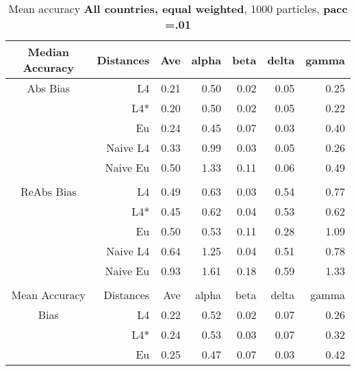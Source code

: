 \documentclass[a4paper,12pt,twoside]{book}
\begin{document}
\begin{table}[H]

\centering
\vfill
\vspace{2cm}
\caption{Mean  accuracy \textbf{All countries, equal weighted}, 1000 particles, \textbf{pacc =.01}}


\begin{tabular}{crrrrrr}

  \hline
  
{\color{blue}Median Accuracy} & Distances & Ave & alpha & beta & delta & gamma \\ 
  \hline
{\color{blue}Abs Bias} & L4  &0.21 & 0.50 & 0.02 & 0.05 & 0.25 \\ 
  
 
&L4*  & 0.20 & 0.50 & 0.02 & 0.05 & 0.22 \\ 
 
  
&Eu &   0.24 & 0.45 & 0.07 & 0.03 & 0.40 \\ 
   
 
&Naive L4&     0.33 & 0.99 & 0.03 & 0.05 & 0.26 \\ 
  
&Naive Eu &   0.50 & 1.33 & 0.11 & 0.06 & 0.49 \\ 
   \\ 
  
   \hline
   
{\color{blue} ReAbs Bias } & L4  &0.49 & 0.63 & 0.03 & 0.54 & 0.77 \\ 
 
&L4*  & 
  0.45 & 0.62 & 0.04 & 0.53 & 0.62 \\ 
  
&Eu &   
   0.50 & 0.53 & 0.11 & 0.28 & 1.09 \\ 
  
  
&Naive L4& 0.64 & 1.25 & 0.04 & 0.51 & 0.78 \\  
  
&Naive Eu &     
   0.93 & 1.61 & 0.18 & 0.59 & 1.33 \\\\
   \hline
{\color{blue}Mean Accuracy} & Distances & Ave & alpha & beta & delta & gamma \\ 
  \hline
{\color{blue}Bias} & L4  &0.22 & 0.52 & 0.02 & 0.07 & 0.26 \\ 
  
&L4*  &0.24 & 0.53 & 0.03 & 0.07 & 0.32 \\ 
  
  
&Eu &   0.25 & 0.47 & 0.07 & 0.03 & 0.42 \\ 
  

\end{tabular}
\end{table}
\end{document}
